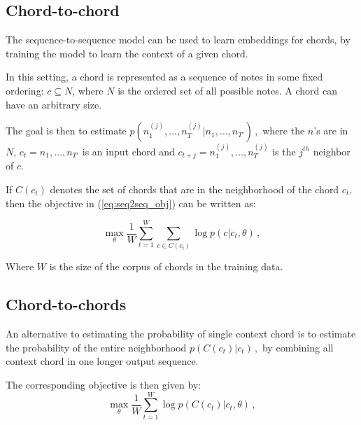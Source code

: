 \documentclass[12pt]{article}\pagestyle{myheadings}
\begin{document}
\subsection{Chord-to-chord}
The sequence-to-sequence model can be used to learn embeddings for chords, by training the model to learn the context of a given chord. 

In this setting, a chord is represented as a sequence of notes in some fixed ordering: $c \subseteq N$, where $N$ is the ordered set of all possible notes. A chord can have an arbitrary size. 

The goal is then to estimate
$
p(n^{(j)}_1, \ldots, n^{(j)}_T | n_1,\ldots,n_{T'})\,,
$
where the $n$'s are in $N$, $ c_t=n_1,\ldots,n_{T'}$ is an input chord and $c_{t+j} =n^{(j)}_1, \ldots, n^{(j)}_T$ is the $j^{th}$ neighbor of $c$.

If $C(c_t)$ denotes the set of chords that are in the neighborhood of the chord $c_t$, then the objective in (\ref{eq:seq2seq_obj}) can be written as:

\begin{equation}
\max_{\theta}  \frac{1}{W} \sum_{t=1}^{W} \sum_{c\in C(c_t)} \log p(c|c_t,\theta)\,,
\label{eq:objective}
\end{equation}

Where $W$ is the size of the corpus of chords in the training data. 


\subsection{Chord-to-chords}
An alternative to estimating the probability of single context chord is to estimate the probability of the entire neighborhood 
$
p(C(c_t) | c_t)\,,
$
by combining all context chord in one longer output sequence. 

The corresponding objective is then given by:
\begin{equation}
\max_{\theta}  \frac{1}{W} \sum_{t=1}^{W} \log p(C(c_t)|c_t,\theta)\,,
\label{eq:objective}
\end{equation}


\newpage

 
\end{document}
